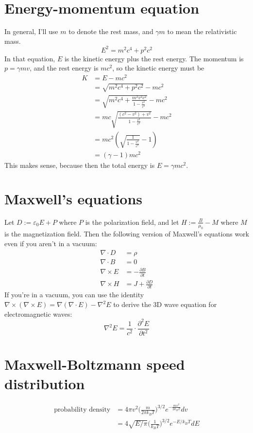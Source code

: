 \documentclass[12pt]{article}
\begin{document}
\section{Energy-momentum equation}
In general, I'll use $m$ to denote the rest mass, and $\gamma m$ to mean the relativistic mass.
\[E^2 = m^2 c^4 + p^2 c^2\]
In that equation, $E$ is the kinetic energy plus the rest energy. The momentum is $p = \gamma m v$, and the rest energy is $mc^2$, so the kinetic energy must be
\begin{align*}
    K &= E - mc^2 \\
      &= \sqrt{m^2 c^4 + p^2 c^2} - mc^2 \\
      &= \sqrt{m^2 c^4 + \frac{m^2 v^2 c^2}{1 - \frac{v^2}{c^2}}} - mc^2 \\
      &= m c \sqrt{\frac{(c^2 - v^2) + v^2}{1 - \frac{v^2}{c^2}}} - mc^2 \\
      &= m c^2 \left( \sqrt{\frac{1}{1 - \frac{v^2}{c^2}}} - 1 \right) \\
      &= (\gamma - 1) m c^2
\end{align*}
This makes sense, because then the total energy is $E = \gamma m c^2$.

\section{Maxwell's equations}
Let $D := \varepsilon_0 E + P$ where $P$ is the polarization field, and let $H := \frac{B}{\mu_0} - M$ where $M$ is the magnetization field. Then the following version of Maxwell's equations work even if you aren't in a vacuum:
\begin{align*}
    \nabla \cdot D &= \rho \\
    \nabla \cdot B &= 0 \\
    \nabla \times E &= - \frac{\partial B}{\partial t} \\
    \nabla \times H &= J + \frac{\partial D}{\partial t}
\end{align*}
If you're in a vacuum, you can use the identity $\nabla \times (\nabla \times E) = \nabla (\nabla \cdot E) - \nabla^2 E$ to derive the 3D wave equation for electromagnetic waves:
\[ \nabla^2 E = \frac{1}{c^2} \cdot \frac{\partial^2 E}{\partial t^2} \]

\section{Maxwell-Boltzmann speed distribution}
\begin{align*}
    \text{probability density} &= 4 \pi v^2 \Big( \frac{m}{2 \pi k_B T} \Big)^{3/2} e^{-\frac{m v^2}{2 k_B T}} dv \\
                               &= 4 \sqrt{E/\pi} \Big( \frac{1}{k_B T} \Big)^{3/2} e^{-E / k_B T} dE
\end{align*}
\end{document}
